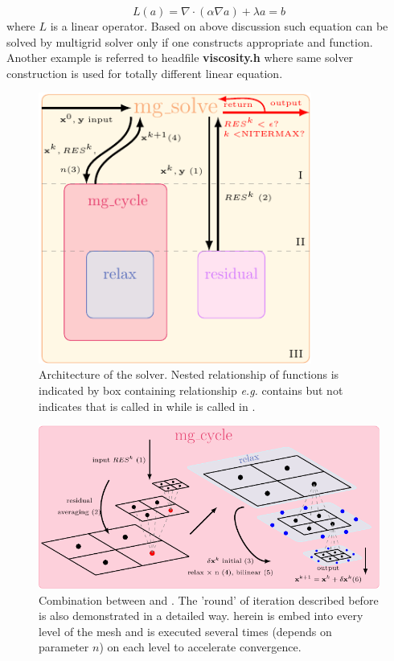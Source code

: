 \begin{equation}\label{equ:poisson-poisson}
  L(a)=\nabla\cdot(\alpha\nabla a) + \lambda a =b
\end{equation}
where $L$ is a linear operator. Based on above discussion such equation can be solved by multigrid solver only if one constructs appropriate  and  function. Another example is referred to headfile \textbf{viscosity.h} where same solver construction is used for totally different linear equation. 

\begin{figure}[H]
    \centering
    \includegraphics[width=0.8\textwidth]{./image/poisson-h/mgsolver}
    \caption{Architecture of the solver. Nested relationship of functions is indicated by box containing relationship \emph{e.g.}  contains  but not  indicates that  is called in  while  is called in .}
    \label{fig:poisson-workflow}
\end{figure}

\begin{figure}[H]
    \centering
    \includegraphics{./image/poisson-h/mgcycle}
    \caption{Combination between  and . The 'round' of iteration described before is also demonstrated in a detailed way.  herein is embed into every level of the mesh and is executed several times (depends on parameter $n$) on each level to accelerate convergence.}
    \label{fig:poisson-mgcycle}
\end{figure}

